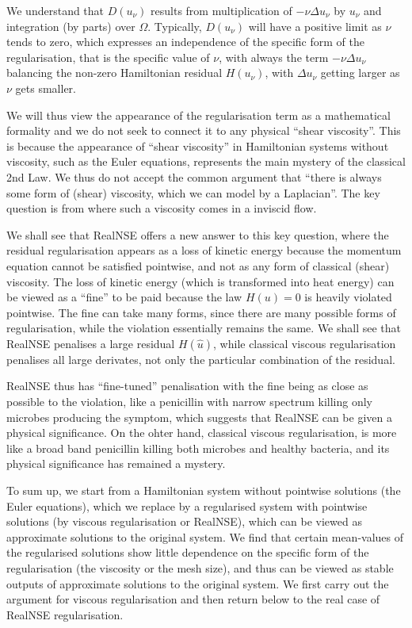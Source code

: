 We understand that $D(u_\nu )$ results from multiplication
of  $-\nu\Delta u_\nu$ by $u_\nu$ and integration 
(by parts) over $\Omega$.
Typically, $D(u_\nu )$ will have a positive limit as $\nu$
tends to zero, which expresses an independence of the specific form of
the regularisation, that is the specific value of $\nu$, with 
always the term  $-\nu\Delta u_\nu$ balancing the non-zero 
Hamiltonian residual $H(u_\nu)$, with $\Delta u_\nu$ getting larger
as $\nu$ gets smaller. 

 
We will thus view the appearance of the regularisation term 
as a mathematical formality and we do not seek to connect it to
any physical ``shear viscosity''. This is because the appearance of 
``shear viscosity'' in Hamiltonian systems  without viscosity, such 
as the Euler equations,  represents the main mystery of the classical 
2nd Law. We thus do not accept the common argument that ``there is always some form
of (shear) viscosity, which we can model by a Laplacian''.
The key question is from where such a viscosity comes in a inviscid
flow.  

We shall see that RealNSE offers a new answer  to this key 
question, where the residual regularisation appears as a 
loss of kinetic energy because the momentum equation cannot
be satisfied pointwise, and not as any form of classical
(shear) viscosity. The loss of kinetic energy (which is transformed
into heat energy) can be viewed as a ``fine'' to be paid 
because the law $H(u)=0$ is heavily violated pointwise. 
The fine can take many forms, since there are many possible
forms of regularisation, while the violation essentially remains the same.
We shall see that RealNSE penalises a large residual $H(\hat u)$, 
while classical viscous regularisation penalises all large derivates, 
not only the particular combination of the residual. 

RealNSE thus
has ``fine-tuned'' penalisation with the fine being as close as possible 
to the violation, like a penicillin with narrow spectrum killing
only microbes producing the symptom, which suggests that
RealNSE can be given a physical significance. On the ohter hand,
classical viscous regularisation, is more like a broad band penicillin 
killing both microbes and healthy bacteria, 
and its physical significance has remained a mystery. 


To sum up, we start from a Hamiltonian system without
pointwise solutions (the Euler equations), 
which we replace by a regularised system
with pointwise solutions (by viscous regularisation or RealNSE), 
which can be viewed as approximate solutions
to the original system. We find that certain mean-values of 
the regularised solutions 
show little dependence on the specific
form of the regularisation (the viscosity or the mesh size), 
and thus can be viewed as stable outputs
of approximate solutions to the original system.
We first carry out the argument for viscous regularisation 
and then return below to the real case of RealNSE regularisation.



